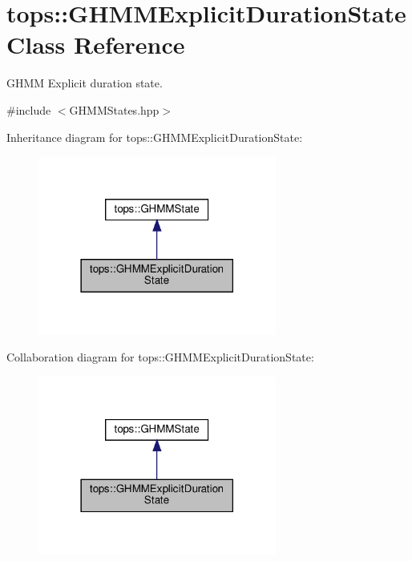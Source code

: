 \hypertarget{classtops_1_1GHMMExplicitDurationState}{}\section{tops\+:\+:G\+H\+M\+M\+Explicit\+Duration\+State Class Reference}
\label{classtops_1_1GHMMExplicitDurationState}


G\+H\+MM Explicit duration state.  




{\ttfamily \#include $<$G\+H\+M\+M\+States.\+hpp$>$}



Inheritance diagram for tops\+:\+:G\+H\+M\+M\+Explicit\+Duration\+State\+:
\nopagebreak
\begin{figure}[H]
\begin{center}
\leavevmode
\includegraphics[width=222pt]{classtops_1_1GHMMExplicitDurationState__inherit__graph}
\end{center}
\end{figure}


Collaboration diagram for tops\+:\+:G\+H\+M\+M\+Explicit\+Duration\+State\+:
\nopagebreak
\begin{figure}[H]
\begin{center}
\leavevmode
\includegraphics[width=222pt]{classtops_1_1GHMMExplicitDurationState__coll__graph}
\end{center}
\end{figure}
